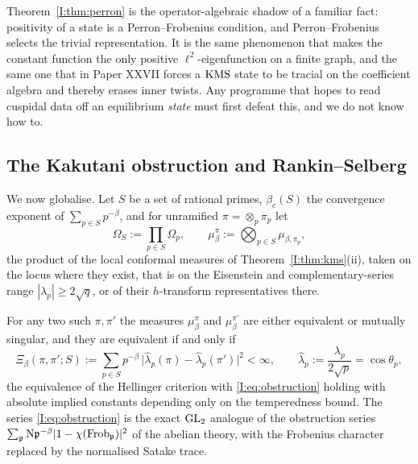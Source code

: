 \begin{remark}
Theorem~\ref{I:thm:perron} is the operator-algebraic shadow of a familiar fact: positivity
of a state is a Perron--Frobenius condition, and Perron--Frobenius selects the trivial
representation. It is the same phenomenon that makes the constant function the only
positive $\ell^2$-eigenfunction on a finite graph, and the same one that in Paper XXVII
forces a $\mathrm{KMS}$ state to be tracial on the coefficient algebra and thereby erases inner
twists. Any programme that hopes to read cuspidal data off an equilibrium \emph{state}
must first defeat this, and we do not know how to.
\end{remark}

\subsection{The Kakutani obstruction and Rankin--Selberg}

We now globalise. Let $S$ be a set of rational primes, $\beta_c(S)$ the convergence
exponent of $\sum_{p\in S}p^{-\beta}$, and for unramified $\pi=\otimes_p\pi_p$ let
\[
\Omega_S:=\prod_{p\in S}\Omega_p,\qquad
\mu^\pi_\beta:=\bigotimes_{p\in S}\mu_{\beta,\pi_p},
\]
the product of the local conformal measures of Theorem~\ref{I:thm:kms}(ii), taken on the
locus where they exist, that is on the Eisenstein and complementary-series range
$|\lambda_p|\ge2\sqrt q$, or of their $h$-transform representatives there.

\begin{theorem}\label{I:thm:kakutani}
For any two such $\pi,\pi'$ the measures $\mu^\pi_\beta$ and $\mu^{\pi'}_\beta$ are
either equivalent or mutually singular, and they are equivalent if and only if
\begin{equation}\label{I:eq:obstruction}
\Xi_\beta(\pi,\pi';S):=\sum_{p\in S}p^{-\beta}\,
\bigl|\widehat\lambda_p(\pi)-\widehat\lambda_p(\pi')\bigr|^2<\infty,
\qquad
\widehat\lambda_p:=\frac{\lambda_p}{2\sqrt p}=\cos\theta_p ,
\end{equation}
the equivalence of the Hellinger criterion with \eqref{I:eq:obstruction} holding with
absolute implied constants depending only on the temperedness bound. The series
\eqref{I:eq:obstruction} is the exact $\mathrm{GL}_2$ analogue of the obstruction series
$\sum_{\mathfrak{p}}\mathrm{N}\mathfrak{p}^{-\beta}|1-\chi(\operatorname{Frob}_{\mathfrak{p}})|^2$ of the abelian theory, with the Frobenius
character replaced by the normalised Satake trace.
\end{theorem}

